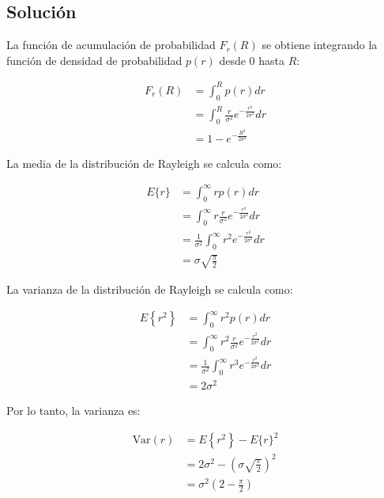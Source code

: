 \documentclass[11pt]{article}
\begin{document}
\subsection*{Solución}


La función de acumulación de probabilidad \(F_r(R)\) se obtiene integrando la función de densidad de probabilidad \(p(r)\) desde 0 hasta \(R\):

\begin{align*}
    F_r(R) &= \int_0^R p(r) dr \\
    &= \int_0^R \frac{r}{\sigma^2} e^{-\frac{r^2}{2\sigma^2}} dr \\
    &= 1 - e^{-\frac{R^2}{2\sigma^2}}
\end{align*}


La media de la distribución de Rayleigh se calcula como:

\begin{align*}
    E\{r\} &= \int_0^\infty r p(r) dr \\
    &= \int_0^\infty r \frac{r}{\sigma^2} e^{-\frac{r^2}{2\sigma^2}} dr \\
    &= \frac{1}{\sigma^2} \int_0^\infty r^2 e^{-\frac{r^2}{2\sigma^2}} dr \\
    &= \sigma \sqrt{\frac{\pi}{2}}
\end{align*}


La varianza de la distribución de Rayleigh se calcula como:

\begin{align*}
    E\left\{r^2\right\} &= \int_0^\infty r^2 p(r) dr \\
    &= \int_0^\infty r^2 \frac{r}{\sigma^2} e^{-\frac{r^2}{2\sigma^2}} dr \\
    &= \frac{1}{\sigma^2} \int_0^\infty r^3 e^{-\frac{r^2}{2\sigma^2}} dr \\
    &= 2\sigma^2
\end{align*}

Por lo tanto, la varianza es:

\begin{align*}
    \text{Var}(r) &= E\left\{r^2\right\} - E\{r\}^2 \\
    &= 2\sigma^2 - \left(\sigma \sqrt{\frac{\pi}{2}}\right)^2 \\
    &= \sigma^2 \left(2 - \frac{\pi}{2}\right)
\end{align*}
\end{document}
